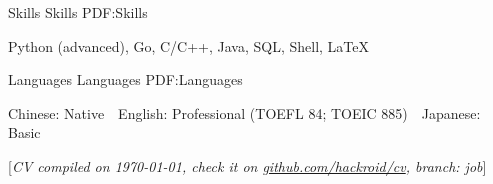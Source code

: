 \documentclass[a4paper,MMMyyyy,nonstopmode]{simpleresumecv}
\newcommand{\CVNote}{CV compiled on {\today}, check it on \href{https://github.com/hackroid/cv}{github.com/hackroid/cv}, branch: job}
\begin{document}
\begin{Body}




    \Section
    {Skills}
    {Skills}
    {PDF:Skills}

    \Entry
    \BulletItem
    Python (advanced),
    Go,
    C/C++,
    Java,
    SQL,
    Shell,
    {\LaTeX}



    \Section
    {Languages}
    {Languages}
    {PDF:Languages}

    \BulletItem
    Chinese: Native \,\BulletSymbol\, English: Professional (TOEFL 84; TOEIC 885) \,\BulletSymbol\, Japanese: Basic









\end{Body}


\UseNoteFont%
\null\hfill%
[\textit{\CVNote}]
\end{document}
